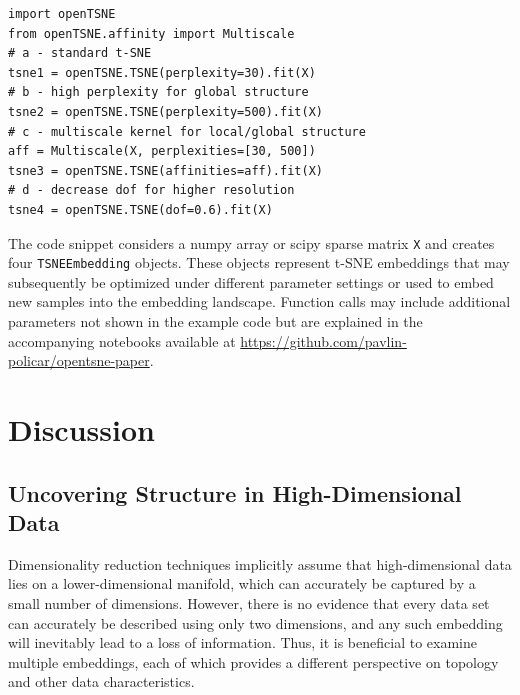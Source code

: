 \documentclass[letter]{article}
\begin{document}
\begin{verbatim}
import openTSNE
from openTSNE.affinity import Multiscale
# a - standard t-SNE
tsne1 = openTSNE.TSNE(perplexity=30).fit(X)
# b - high perplexity for global structure
tsne2 = openTSNE.TSNE(perplexity=500).fit(X)
# c - multiscale kernel for local/global structure
aff = Multiscale(X, perplexities=[30, 500])
tsne3 = openTSNE.TSNE(affinities=aff).fit(X)
# d - decrease dof for higher resolution
tsne4 = openTSNE.TSNE(dof=0.6).fit(X)
\end{verbatim}

\noindent The code snippet considers a \textsf{numpy} array or \textsf{scipy}
sparse matrix \texttt{X} and creates four \texttt{TSNEEmbedding} objects. These
objects represent t-SNE embeddings that may subsequently be optimized under
different parameter settings or used to embed new samples into the embedding
landscape. Function calls may include additional parameters not shown in the
example code but are explained in the accompanying notebooks available at
\url{https://github.com/pavlin-policar/opentsne-paper}.

\section*{Discussion}

\subsection*{Uncovering Structure in High-Dimensional Data}

Dimensionality reduction techniques implicitly assume that high-dimensional data
lies on a lower-dimensional manifold, which can accurately be captured by a
small number of dimensions. However, there is no evidence that every data set
can accurately be described using only two dimensions, and any such embedding
will inevitably lead to a loss of information. Thus, it is beneficial to examine
multiple embeddings, each of which provides a different perspective on topology
and other data characteristics.
\end{document}
